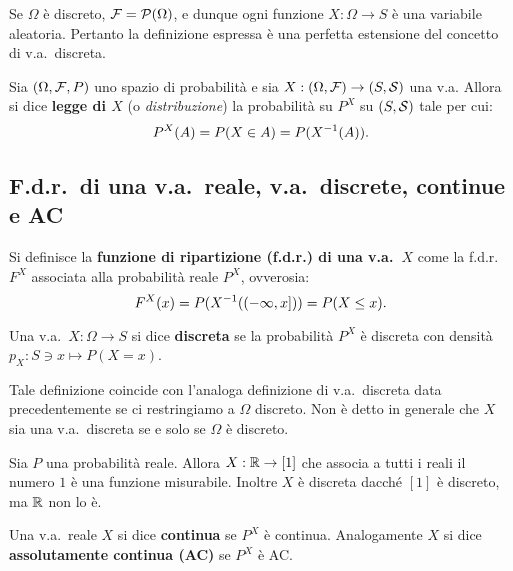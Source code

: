 \begin{multicols*}{2}
\begin{remark}
    Se $\Omega$ è discreto, $\mathcal{F} = \mathcal{P}(\Omega)$, e dunque ogni funzione
    $X : \Omega \to S$ è una variabile aleatoria. Pertanto la definizione
    espressa è una perfetta estensione del concetto di v.a.~discreta.
\end{remark}

\begin{definition}[Legge di $X$]
    Sia $(\Omega, \mathcal{F}, P)$ uno spazio di probabilità e sia
    $X : (\Omega, \mathcal{F}) \to (S, \mathcal{S})$ una v.a. Allora si dice
    \textbf{legge di $X$} (o \textit{distribuzione}) la probabilità
    su $P^X$ su $(S, \mathcal{S})$ tale per cui:
    \[
        P^X(A) = P(X \in A) = P(X^{-1}(A)).
    \]
\end{definition}

\subsection{F.d.r.~di una v.a.~reale, v.a.~discrete, continue e AC}

\begin{definition}
    Si definisce la \textbf{funzione di ripartizione (f.d.r.) di una
    v.a.~$X$} come la f.d.r.~$F^X$ associata alla probabilità reale
    $P^X$, ovverosia:
    \[
        F^X(x) = P(X^{-1}((-\infty, x])) = P(X \leq x).
    \]
\end{definition}

\begin{definition}[V.a.~discreta]
    Una v.a.~$X : \Omega \to S$ si dice \textbf{discreta} se
    la probabilità $P^X$ è discreta con densità
    $p_X : S \ni x \mapsto P(X = x)$. \smallskip


    Tale definizione coincide con l'analoga definizione
    di v.a.~discreta data precedentemente se ci restringiamo
    a $\Omega$ discreto. Non è detto in generale che
    $X$ sia una v.a.~discreta se e solo se $\Omega$ è discreto.
\end{definition}

\begin{example}
    Sia $P$ una probabilità reale. Allora $X : \mathbb{R} \to [1]$ che
    associa a tutti i reali il numero $1$ è una funzione misurabile.
    Inoltre $X$ è discreta dacché $[1]$ è discreto, ma $\mathbb{R}$ non
    lo è.
\end{example}

\begin{definition}[V.a.~continue e AC]
    Una v.a.~reale $X$ si dice \textbf{continua} se $P^X$ è
    continua. Analogamente $X$ si dice \textbf{assolutamente
    continua (AC)} se $P^X$ è AC.
\end{definition}


\end{multicols*}

